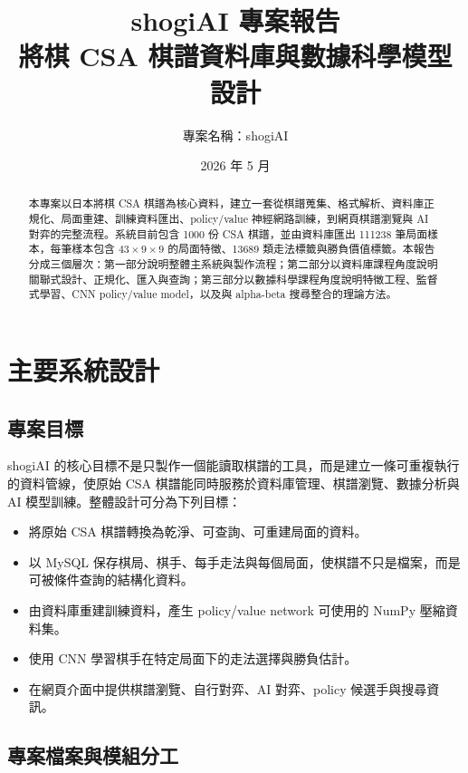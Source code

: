 \documentclass[12pt,a4paper,fontset=none]{ctexart}
\title{\textbf{shogiAI 專案報告}\\
\large 將棋 CSA 棋譜資料庫與數據科學模型設計}
\author{專案名稱：shogiAI}
\date{2026 年 5 月}
\begin{document}
\maketitle

\begin{abstract}
本專案以日本將棋 CSA 棋譜為核心資料，建立一套從棋譜蒐集、格式解析、資料庫正規化、局面重建、訓練資料匯出、policy/value 神經網路訓練，到網頁棋譜瀏覽與 AI 對弈的完整流程。系統目前包含 1000 份 CSA 棋譜，並由資料庫匯出 111238 筆局面樣本，每筆樣本包含 $43 \times 9 \times 9$ 的局面特徵、13689 類走法標籤與勝負價值標籤。本報告分成三個層次：第一部分說明整體主系統與製作流程；第二部分以資料庫課程角度說明關聯式設計、正規化、匯入與查詢；第三部分以數據科學課程角度說明特徵工程、監督式學習、CNN policy/value model，以及與 alpha-beta 搜尋整合的理論方法。
\end{abstract}

\tableofcontents
\newpage

\section{主要系統設計}

\subsection{專案目標}
shogiAI 的核心目標不是只製作一個能讀取棋譜的工具，而是建立一條可重複執行的資料管線，使原始 CSA 棋譜能同時服務於資料庫管理、棋譜瀏覽、數據分析與 AI 模型訓練。整體設計可分為下列目標：

\begin{itemize}
  \item 將原始 CSA 棋譜轉換為乾淨、可查詢、可重建局面的資料。
  \item 以 MySQL 保存棋局、棋手、每手走法與每個局面，使棋譜不只是檔案，而是可被條件查詢的結構化資料。
  \item 由資料庫重建訓練資料，產生 policy/value network 可使用的 NumPy 壓縮資料集。
  \item 使用 CNN 學習棋手在特定局面下的走法選擇與勝負估計。
  \item 在網頁介面中提供棋譜瀏覽、自行對弈、AI 對弈、policy 候選手與搜尋資訊。
\end{itemize}

\subsection{專案檔案與模組分工}
\end{document}
